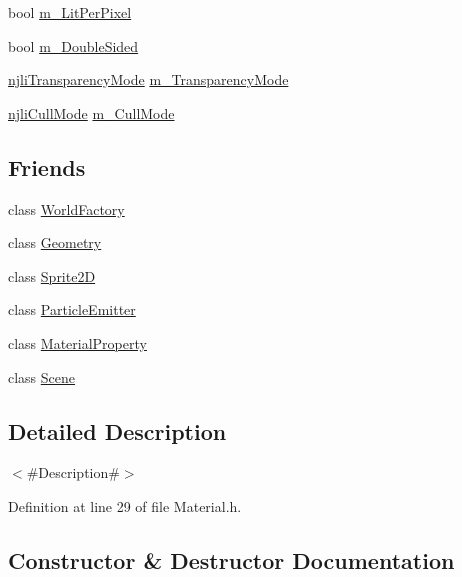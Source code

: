\begin{DoxyCompactItemize}
\item 
bool \mbox{\hyperlink{classnjli_1_1_material_afb1e5515756851ea25491828e35da57a}{m\+\_\+\+Lit\+Per\+Pixel}}
\item 
bool \mbox{\hyperlink{classnjli_1_1_material_a12bcd32fc000bb1c86c4b55b41a2bf63}{m\+\_\+\+Double\+Sided}}
\item 
\mbox{\hyperlink{namespacenjli_ae6563db51402a0e02a3e55ef556afdd9}{njli\+Transparency\+Mode}} \mbox{\hyperlink{classnjli_1_1_material_a635e9141bcc8d3963deb734427f91de8}{m\+\_\+\+Transparency\+Mode}}
\item 
\mbox{\hyperlink{namespacenjli_a2247adafa5de18bc18550918b4ed48d8}{njli\+Cull\+Mode}} \mbox{\hyperlink{classnjli_1_1_material_a186c0897e4c86131c61cf81d775d6baa}{m\+\_\+\+Cull\+Mode}}
\end{DoxyCompactItemize}
\subsection*{Friends}
\begin{DoxyCompactItemize}
\item 
class \mbox{\hyperlink{classnjli_1_1_material_acb96ebb09abe8f2a37a915a842babfac}{World\+Factory}}
\item 
class \mbox{\hyperlink{classnjli_1_1_material_a9aca7b7350e6ffa0e2d6320834ad1857}{Geometry}}
\item 
class \mbox{\hyperlink{classnjli_1_1_material_ac1e5ab02d2359e991783010c562791e4}{Sprite2D}}
\item 
class \mbox{\hyperlink{classnjli_1_1_material_a82b374d797a09668286ac5cf26f539f3}{Particle\+Emitter}}
\item 
class \mbox{\hyperlink{classnjli_1_1_material_ae7c7f3376b81514442fbc2a5fe2f5ec9}{Material\+Property}}
\item 
class \mbox{\hyperlink{classnjli_1_1_material_a032858ae1fe02d2d1170981c2af2d67c}{Scene}}
\end{DoxyCompactItemize}


\subsection{Detailed Description}
$<$\#\+Description\#$>$ 

Definition at line 29 of file Material.\+h.



\subsection{Constructor \& Destructor Documentation}
\mbox{\label{classnjli_1_1_material_a95266db699eaabe4754d72f2c577deeb}} 
